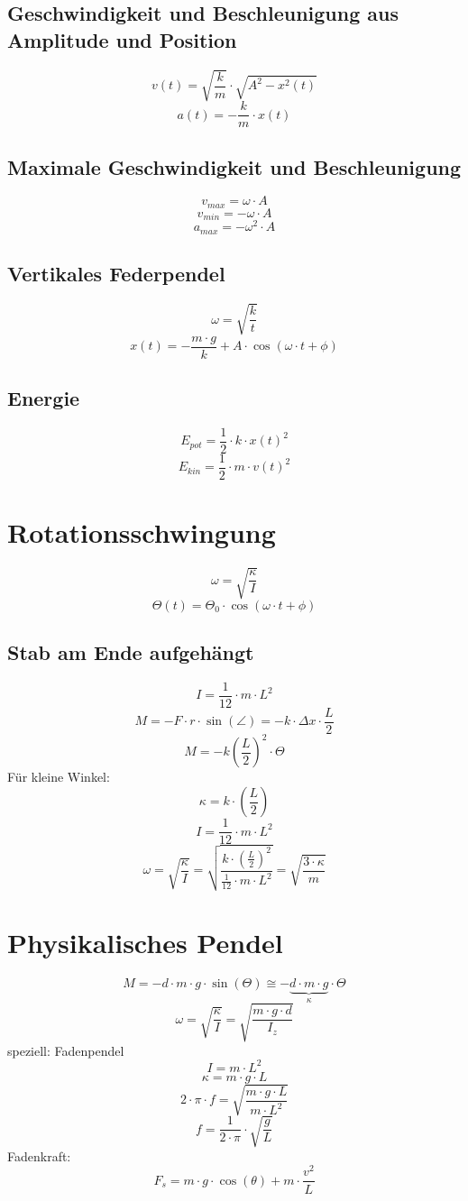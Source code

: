 \subsection{Geschwindigkeit und Beschleunigung aus Amplitude und Position}
\[ \boxed{v(t) = \sqrt{\frac{k}{m}} \cdot \sqrt{A^2 - x^2(t)}} \]
\[ \boxed{a(t) = - \frac{k}{m} \cdot x(t)} \]

\subsection{Maximale Geschwindigkeit und Beschleunigung}
\[ \boxed{v_{max} = \omega \cdot A} \]
\[ \boxed{v_{min} = -\omega \cdot A} \]
\[ \boxed{a_{max} = -\omega^2 \cdot A} \]

\subsection{Vertikales Federpendel}
\[ \boxed{\omega = \sqrt{\frac{k}{t}}} \]
\[ \boxed{x(t) = - \frac{m \cdot g}{k} + A \cdot \cos(\omega \cdot t + \phi)} \]

\subsection{Energie}
\[ \boxed{E_{pot} = \frac{1}{2} \cdot k \cdot x(t)^2} \]
\[ \boxed{E_{kin} = \frac{1}{2} \cdot m \cdot v(t)^2} \]

\section{Rotationsschwingung}
\[ \boxed{\omega = \sqrt{\frac{\kappa}{I}}} \]
\[ \boxed{\Theta(t) = \Theta_0 \cdot \cos(\omega \cdot t + \phi)} \]

\subsection{Stab am Ende aufgehängt}
\[ \boxed{I = \frac{1}{12} \cdot m \cdot L^2} \]
\[ \boxed{M = -F \cdot r \cdot \sin(\angle) = -k \cdot \Delta x \cdot \frac{L}{2}} \]
\[ \boxed{M = -k \left(\frac{L}{2}\right)^2 \cdot \Theta} \]
Für kleine Winkel: 
\[ \boxed{\kappa = k \cdot \left(\frac{L}{2}\right)} \]
\[ \boxed{I = \frac{1}{12} \cdot m \cdot L^2} \]
\[ \boxed{\omega = \sqrt{\frac{\kappa}{I}} 
= \sqrt{\frac{k \cdot \left(\frac{L}{2}\right)^2}{\frac{1}{12}\cdot m \cdot L^2}} 
= \sqrt{\frac{3 \cdot \kappa}{m}}} \]

\section{Physikalisches Pendel}
\[ \boxed{M = -d \cdot m \cdot g \cdot \sin(\Theta) 
\cong - \underbrace{d \cdot m \cdot g}_{\kappa} \cdot \Theta} \]
\[ \boxed{\omega = \sqrt{\frac{\kappa}{I}} 
= \sqrt{\frac{m \cdot g \cdot d}{I_z}}} \]
speziell: Fadenpendel
\[ \boxed{I = m \cdot L^2} \]
\[ \boxed{\kappa = m \cdot g \cdot L} \]
\[ \boxed{2 \cdot \pi \cdot f = \sqrt{\frac{m \cdot g \cdot L}{m \cdot L^2}}} \]
\[ \boxed{f = \frac{1}{2 \cdot \pi} \cdot \sqrt{\frac{g}{L}}} \]
Fadenkraft: 
\[ \boxed{F_s = m \cdot g \cdot \cos(\theta) + m \cdot \frac{v^2}{L}} \]

